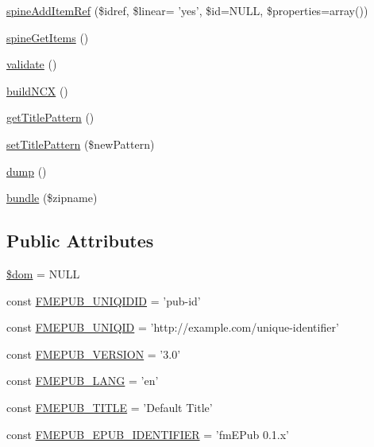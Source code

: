 \begin{DoxyCompactItemize}
\item 
\hyperlink{classFunnyMonkey_1_1EPUB_1_1EPUBPackage_a1f1bcd580f6abb3077f32e9f8758341c}{spineAddItemRef} (\$idref, \$linear= 'yes', \$id=NULL, \$properties=array())
\item 
\hyperlink{classFunnyMonkey_1_1EPUB_1_1EPUBPackage_abc821972f42646a44b7e5df997dd5d2d}{spineGetItems} ()
\item 
\hyperlink{classFunnyMonkey_1_1EPUB_1_1EPUBPackage_af852e4c93e004a87563adb6662daa914}{validate} ()
\item 
\hyperlink{classFunnyMonkey_1_1EPUB_1_1EPUBPackage_ac5b7284497f5e6aa65077c6651223f3f}{buildNCX} ()
\item 
\hyperlink{classFunnyMonkey_1_1EPUB_1_1EPUBPackage_aae0a2fff4311ecf8af05e9d5d228f5c5}{getTitlePattern} ()
\item 
\hyperlink{classFunnyMonkey_1_1EPUB_1_1EPUBPackage_aca3dafa2a6998f6c10e2f8e10c62d7be}{setTitlePattern} (\$newPattern)
\item 
\hyperlink{classFunnyMonkey_1_1EPUB_1_1EPUBPackage_a16cd63a044d7fa71f5add5deac7548b0}{dump} ()
\item 
\hyperlink{classFunnyMonkey_1_1EPUB_1_1EPUBPackage_aa36c1d1649bbcd46753e13be5b7a7657}{bundle} (\$zipname)
\end{DoxyCompactItemize}
\subsection*{Public Attributes}
\begin{DoxyCompactItemize}
\item 
\hyperlink{classFunnyMonkey_1_1EPUB_1_1EPUBPackage_ac404923cc54a532d4f4522a4bfc287b5}{\$dom} = NULL
\item 
const \hyperlink{classFunnyMonkey_1_1EPUB_1_1EPUBPackage_a04ae6219877affddb66faf9c97bd5777}{FMEPUB\_\-UNIQIDID} = 'pub-\/id'
\item 
const \hyperlink{classFunnyMonkey_1_1EPUB_1_1EPUBPackage_ae79337bf6fc98f515f9c1c5850c7c860}{FMEPUB\_\-UNIQID} = 'http://example.com/unique-\/identifier'
\item 
const \hyperlink{classFunnyMonkey_1_1EPUB_1_1EPUBPackage_aa54a86dd6eb3280a24747f46d42a9f1e}{FMEPUB\_\-VERSION} = '3.0'
\item 
const \hyperlink{classFunnyMonkey_1_1EPUB_1_1EPUBPackage_a89d2d8a3d8150fa16fa009c328ed02f2}{FMEPUB\_\-LANG} = 'en'
\item 
const \hyperlink{classFunnyMonkey_1_1EPUB_1_1EPUBPackage_a199af72a2552e7150d5af0afab5d8fc1}{FMEPUB\_\-TITLE} = 'Default Title'
\item 
const \hyperlink{classFunnyMonkey_1_1EPUB_1_1EPUBPackage_a6e75be3ee6f665e90f89ef6adc96a28d}{FMEPUB\_\-EPUB\_\-IDENTIFIER} = 'fmEPub 0.1.x'
\end{DoxyCompactItemize}
